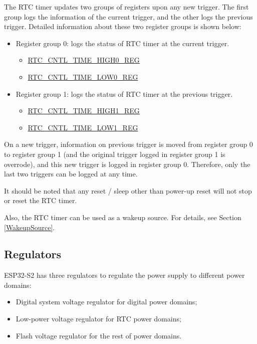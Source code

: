 \documentclass[main\_\_EN.tex]{subfiles}
\begin{document}
The RTC timer updates two groups of registers upon any new trigger. The first group logs the information of the current trigger, and the other logs the previous trigger. Detailed information about these two register groups is shown below:

\begin{itemize}
    \item Register group 0: logs the status of RTC timer at the current trigger.
    \begin{itemize}
        \item \hyperref[regdesc:RTCCNTLTIMEHIGH0REG]{RTC\_CNTL\_TIME\_HIGH0\_REG}
        \item \hyperref[regdesc:RTCCNTLTIMELOW0REG]{RTC\_CNTL\_TIME\_LOW0\_REG}
    \end{itemize}
    \item Register group 1: logs the status of RTC timer at the previous trigger.
    \begin{itemize}
    \item \hyperref[regdesc:RTCCNTLTIMEHIGH1REG]{RTC\_CNTL\_TIME\_HIGH1\_REG}
    \item \hyperref[regdesc:RTCCNTLTIMELOW1REG]{RTC\_CNTL\_TIME\_LOW1\_REG}
    \end{itemize}
\end{itemize}

On a new trigger, information on previous trigger is moved from register group 0 to register group 1 (and the original trigger logged in register group 1 is overrode), and this new trigger is logged in register group 0. Therefore, only the last two triggers can be logged at any time.

It should be noted that any reset / sleep other than power-up reset will not stop or reset the RTC timer.

Also, the RTC timer can be used as a wakeup source. For details, see Section \ref{WakeupSource}.

\subsection{Regulators}

ESP32-S2 has three regulators to regulate the power supply to different power domains:
\begin{itemize}
    \item Digital system voltage regulator for digital power domains;
    \item Low-power voltage regulator for RTC power domains;
    \item Flash voltage regulator for the rest of power domains.
\end{itemize}
\end{document}
